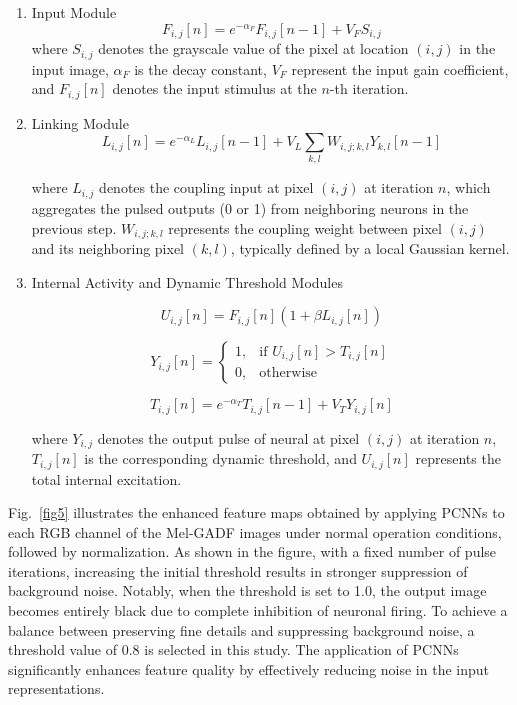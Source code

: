 \documentclass[final,5p,times,twocolumn]{elsarticle}
\begin{document}
\begin{enumerate}
	\item{Input Module} 
	\begin{equation}
		F_{i,j}[n] = e^{-\alpha_{F}} F_{i,j}[n - 1] + V_{F} S_{i,j}
	\end{equation}
	where \(S_{i,j}\) denotes the grayscale value of the pixel at location \((i, j)\) in the input image, \(\alpha_{F}\) is the decay constant, \(V_{F}\) represent the input gain coefficient, and \(F_{i,j}[n]\)  denotes the input stimulus at the \(n\)-th iteration.
	
	\item{Linking Module}
	\begin{equation}
		L_{i,j}[n] = e^{-\alpha_L} L_{i,j}[n-1] + V_L \sum_{k,l} W_{i,j;k,l} Y_{k,l}[n-1]
	\end{equation}
	
	where \(L_{i,j}\) denotes the coupling input at pixel \((i, j)\) at iteration \(n\), which aggregates the pulsed outputs (0 or 1) from neighboring neurons in the previous step. \(W_{i,j;k,l}\) represents the coupling weight between pixel \((i, j)\) and its neighboring pixel \((k, l)\), typically defined by a local Gaussian kernel.
	
	\item{Internal Activity and Dynamic Threshold Modules}
	
	\begin{equation}
		U_{i,j}[n] = F_{i,j}[n] (1 + \beta L_{i,j}[n])
	\end{equation}
	
	\begin{equation}
		Y_{i,j}[n] = 
		\begin{cases} 
			1, & \text{if } U_{i,j}[n] > T_{i,j}[n] \\
			0, & \text{otherwise}
		\end{cases}
	\end{equation}
	
	\begin{equation}
		T_{i,j}[n] = e^{-\alpha_T} T_{i,j}[n-1] + V_T Y_{i,j}[n]
	\end{equation}
	
	where \(Y_{i,j}\) denotes the output pulse of neural at pixel \((i, j)\) at iteration \(n\), \(T_{i,j}[n]\) is the corresponding dynamic threshold, and \(U_{i,j}[n]\) represents the total internal excitation.
\end{enumerate}

Fig.~\ref{fig5} illustrates the enhanced feature maps obtained by applying PCNNs to each RGB channel of the Mel-GADF images under normal operation conditions, followed by normalization. As shown in the figure, with a fixed number of pulse iterations, increasing the initial threshold results in stronger suppression of background noise. Notably, when the threshold is set to 1.0, the output image becomes entirely black due to complete inhibition of neuronal firing. To achieve a balance between preserving fine details and suppressing background noise, a threshold value of 0.8 is selected in this study. The application of PCNNs significantly enhances feature quality by effectively reducing noise in the input representations.
\end{document}
